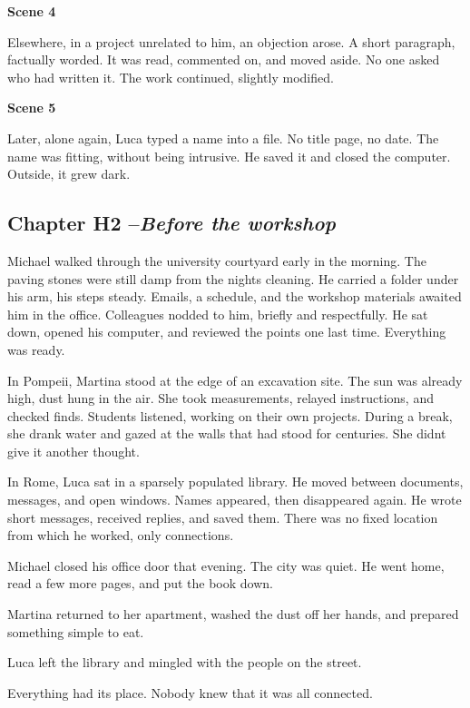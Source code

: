 \documentclass[
]{article}
\begin{document}
\textbf{Scene 4}

Elsewhere, in a project unrelated to him, an objection arose. A short paragraph, factually worded. It was read, commented on, and moved aside. No one asked who had written it. The work continued, slightly modified.

\textbf{Scene 5}

Later, alone again, Luca typed a name into a file. No title page, no date. The name was fitting, without being intrusive. He saved it and closed the computer. Outside, it grew dark.

\subsection{\texorpdfstring{Chapter H2 --\emph{Before the workshop}}{Chapter H2 --Before the workshop}}\label{chapter-h2-before-the-workshop}

Michael walked through the university courtyard early in the morning. The paving stones were still damp from the night\textquotesingle s cleaning. He carried a folder under his arm, his steps steady. Emails, a schedule, and the workshop materials awaited him in the office. Colleagues nodded to him, briefly and respectfully. He sat down, opened his computer, and reviewed the points one last time. Everything was ready.

In Pompeii, Martina stood at the edge of an excavation site. The sun was already high, dust hung in the air. She took measurements, relayed instructions, and checked finds. Students listened, working on their own projects. During a break, she drank water and gazed at the walls that had stood for centuries. She didn\textquotesingle t give it another thought.

In Rome, Luca sat in a sparsely populated library. He moved between documents, messages, and open windows. Names appeared, then disappeared again. He wrote short messages, received replies, and saved them. There was no fixed location from which he worked, only connections.

Michael closed his office door that evening. The city was quiet. He went home, read a few more pages, and put the book down.

Martina returned to her apartment, washed the dust off her hands, and prepared something simple to eat.

Luca left the library and mingled with the people on the street.

Everything had its place. Nobody knew that it was all connected.
\end{document}
